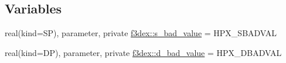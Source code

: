 \subsection*{Variables}
\begin{DoxyCompactItemize}
\item 
real(kind=SP), parameter, private \hyperlink{namespacef3dex_a5d027a15cdc55f7ea6b40a075c6f9eb8}{f3dex::s\_\-bad\_\-value} = HPX\_\-SBADVAL
\item 
real(kind=DP), parameter, private \hyperlink{namespacef3dex_af925e5023c935decb72a6698b234045d}{f3dex::d\_\-bad\_\-value} = HPX\_\-DBADVAL
\end{DoxyCompactItemize}
